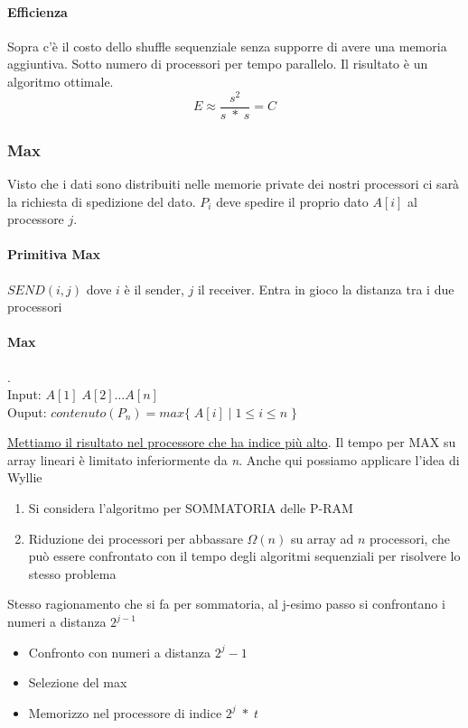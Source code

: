 \paragraph{Efficienza}
Sopra c'è il costo dello shuffle sequenziale senza supporre di avere una memoria aggiuntiva. Sotto numero di processori per tempo parallelo. Il risultato è un algoritmo ottimale.
$$E \approx \frac{s^2}{s\;*\;s} = C$$

\subsubsection{Max}
Visto che i dati sono distribuiti nelle memorie private dei nostri processori ci sarà la richiesta di spedizione del dato. $P_i$ deve spedire il proprio dato $A[i]$ al processore $j$.

\paragraph{Primitiva Max}
$SEND(i,j)$ dove $i$ è il sender, $j$ il receiver. Entra in gioco la distanza tra i due processori


\paragraph{Max}.\\
Input: $A[1]\;A[2]\dots A[n]$\\
Ouput: $contenuto(P_n) = max\{\;A[i]\;|\;1 \leq i \leq n\;\}$

\uline{Mettiamo il risultato nel processore che ha indice più alto}. Il tempo per MAX su array lineari è limitato inferiormente da \textit{n}. Anche qui possiamo applicare l'idea di Wyllie

\begin{enumerate}
    \item Si considera l'algoritmo per SOMMATORIA delle P-RAM
    \item Riduzione dei processori per abbassare $\Omega(n)$ su array ad $n$ processori, che può essere confrontato con il tempo degli algoritmi sequenziali per risolvere lo stesso problema
\end{enumerate}

Stesso ragionamento che si fa per sommatoria, al j-esimo passo si confrontano i numeri a distanza $2^{j-1}$

\begin{itemize}
    \item Confronto con numeri a distanza $2^j-1$
    \item Selezione del max
    \item Memorizzo nel processore di indice $2^j\;*\;t$
\end{itemize}

